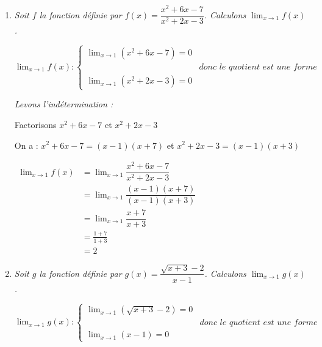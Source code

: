 \documentclass[12pt,a4paper]{article}
\begin{document}
\begin{enumerate}
    \item \textit{Soit $f$ la fonction définie par $f(x) = \dfrac{x^2 + 6x - 7}{x^2 + 2x - 3}$. Calculons $\displaystyle \lim_{x \to 1} f(x)$.}
    
    \vspace{0.1cm}
    
    $
    \displaystyle \lim_{x \to 1} f(x):
    \begin{cases}
    \displaystyle \lim_{x \to 1} (x^2 + 6x - 7) = 0\\[3mm]
    &\textit{donc le quotient est une forme indéterminée.}\\
    \displaystyle \lim_{x \to 1} (x^2 + 2x - 3) = 0
    \end{cases}
    $
 
    \textit{Levons l'indétermination :}
    
    Factorisons $ x^2 + 6x - 7 $  et $x^2 + 2x - 3 $
    
    On a : $ x^2 + 6x - 7 = (x - 1)(x + 7)$  et $x^2 + 2x - 3 = (x - 1)(x + 3)$
    
    $
    \begin{aligned}
    \displaystyle \lim_{x \to 1} f(x) & =\displaystyle \lim_{x \to 1} \dfrac{x^2 + 6x - 7}{x^2 + 2x - 3}\\
    									 &=\displaystyle \lim_{x \to 1} \dfrac{(x - 1)(x + 7)}{(x - 1)(x + 3)}\\
    									 &=\displaystyle \lim_{x \to 1} \dfrac{x + 7}{x + 3}\\
    									 &= \frac{1 + 7}{1 + 3}\\
    									 &= 2
    \end{aligned}
    $
    
 

    \vspace{0.6cm}

    \item \textit{Soit $g$ la fonction définie par $g(x) = \dfrac{\sqrt{x + 3} - 2}{x - 1}$. Calculons $\displaystyle \lim_{x \to 1} g(x)$.}
    
    \vspace{0.1cm}
    
    $
    \displaystyle \lim_{x \to 1} g(x):
    \begin{cases}
    \displaystyle \lim_{x \to 1} (\sqrt{x + 3} - 2) = 0\\[3mm]
    &\textit{donc le quotient est une forme indéterminée.}\\
    \displaystyle \lim_{x \to 1} (x - 1) = 0
    \end{cases}
    $


\end{enumerate}
\end{document}
